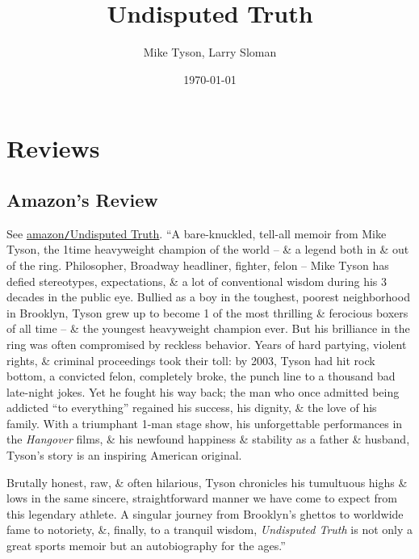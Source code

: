 \documentclass{article}
\title{Undisputed Truth}
\author{Mike Tyson, Larry Sloman}
\date{\today}
\numberwithin{equation}{section}
\begin{document}
\maketitle
\tableofcontents


\section{Reviews}

\subsection{Amazon's Review}
See \href{https://www.amazon.com/Undisputed-Truth-Mike-Tyson/dp/0399161287}{amazon\texttt{/}Undisputed Truth}. ``A bare-knuckled, tell-all memoir from Mike Tyson, the 1time heavyweight champion of the world -- \& a legend both in \& out of the ring. Philosopher, Broadway headliner, fighter, felon -- Mike Tyson has defied stereotypes, expectations, \& a lot of conventional wisdom during his 3 decades in the public eye. Bullied as a boy in the toughest, poorest neighborhood in Brooklyn, Tyson grew up to become 1 of the most thrilling \& ferocious boxers of all time -- \& the youngest heavyweight champion ever. But his brilliance in the ring was often compromised by reckless behavior. Years of hard partying, violent rights, \& criminal proceedings took their toll: by 2003, Tyson had hit rock bottom, a convicted felon, completely broke, the punch line to a thousand bad late-night jokes. Yet he fought his way back; the man who once admitted being addicted ``to everything'' regained his success, his dignity, \& the love of his family. With a triumphant 1-man stage show, his unforgettable performances in the \textit{Hangover} films, \& his newfound happiness \& stability as a father \& husband, Tyson's story is an inspiring American original.

Brutally honest, raw, \& often hilarious, Tyson chronicles his tumultuous highs \& lows in the same sincere, straightforward manner we have come to expect from this legendary athlete. A singular journey from Brooklyn's ghettos to worldwide fame to notoriety, \&, finally, to a tranquil wisdom, \textit{Undisputed Truth} is not only a great sports memoir but an autobiography for the ages.''
\end{document}
